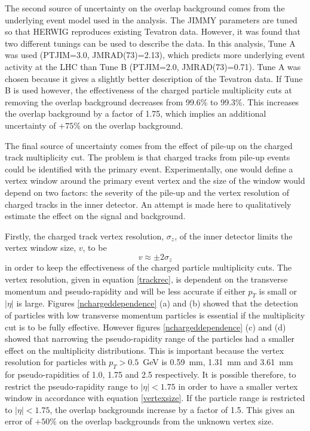 The second source of uncertainty on the overlap background comes from the underlying event model used in the analysis. The JIMMY parameters are tuned so that HERWIG reproduces existing Tevatron data. However, it was found \cite{Alekhin:2005dx:MPITune} that two different tunings can be used to describe the data. In this analysis, Tune A was used (PTJIM=3.0, JMRAD(73)=2.13), which predicts more underlying event activity at the LHC than Tune B (PTJIM=2.0, JMRAD(73)=0.71). 
Tune A was chosen because it gives a slightly better description of the Tevatron data.
If Tune B is used however, the effectiveness of the charged particle multiplicity cuts at removing the overlap background decreases from 99.6\% to 99.3\%. This increases the overlap background by a factor of 1.75, which implies an additional uncertainty of $+75$\% on the overlap background. 

The final source of uncertainty comes from the effect of pile-up on the charged track multiplicity cut. The problem is that charged tracks from pile-up events could be identified with the primary event. Experimentally, one would define a vertex window around the primary event vertex and the size of the window would depend on two factors: the severity of the pile-up and the vertex resolution of charged tracks in the inner detector. An attempt is made here to qualitatively estimate the effect on the signal and background.

Firstly, the charged track vertex resolution, $\sigma_z$, of the inner detector limits the vertex window size, $v$, to be
\begin{equation} \label{vertexsize}
v \approx \pm 2\sigma_z
\end{equation}
in order to keep the effectiveness of the charged particle multiplicity cuts. The vertex resolution, given in equation \ref{trackrec}, is dependent on the transverse momentum and pseudo-rapidity and will be less accurate if either $p_T$ is small or $|\eta|$ is large. Figures \ref{nchargeddependence} (a) and (b)  showed that the detection of particles with low transverse momentum particles is essential if the multiplicity cut is to be fully effective. However figures \ref{nchargeddependence} (c) and (d) showed that narrowing the pseudo-rapidity range of the particles had a smaller effect on the multiplicity distributions. This is important because the vertex resolution for particles with $p_T>0.5$~GeV is 0.59~mm, 1.31~mm and 3.61~mm for pseudo-rapidities of 1.0, 1.75 and 2.5 respectively. It is possible therefore, to restrict the pseudo-rapidity range to $|\eta| < 1.75$ in order to have a smaller vertex window in accordance with equation \ref{vertexsize}. If the particle range is restricted to $|\eta|<1.75$, the overlap backgrounds increase by a factor of 1.5. This gives an error of $+50\%$ on the overlap backgrounds from the unknown vertex size.

